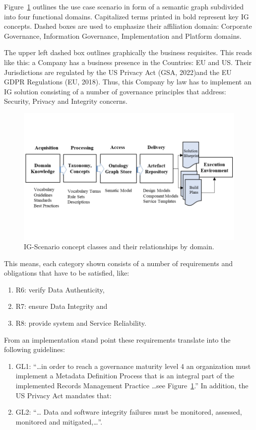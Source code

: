 \documentclass[runningheads]{llncs}
\begin{document}
Figure~\ref{fig3} outlines the use case scenario in form of a semantic graph subdivided into four functional domains. Capitalized terms printed in bold represent key IG concepts. Dashed boxes are used to emphasize their affiliation domain: Corporate Governance, Information Governance, Implementation and Platform domains.

The upper left dashed box outlines graphically the business requisites. This reads like this: a Company has a business presence in the Countries: EU and US. Their Jurisdictions are regulated by the US Privacy Act (GSA, 2022)and the EU GDPR Regulations (EU, 2018). Thus, this Company by law has to implement an IG solution consisting of a number of governance principles that address: Security, Privacy and Integrity concerns.

\begin{figure} [h]
 \centering
\includegraphics[page=3,width=.8\textwidth]{IGSModelsLarge.pdf}
\caption{IG-Scenario concept classes and their relationships by domain.} \label{fig3}
\end{figure} \vspace{-10pt}

This means, each category shown consists of a number of requirements and obligations that have to be satisfied, like: 
\begin{enumerate}
    \item R6: verify Data Authenticity, 
    \item R7: ensure Data Integrity and 
    \item R8: provide system and Service Reliability. 
\end{enumerate}

From an implementation stand point these requirements translate into the following guidelines:
\begin{enumerate}
    \item GL1: “…in order to reach a governance maturity level 4 an organization must implement a Metadata Definition Process that is an integral part of the implemented Records Management Practice …see Figure~\ref{fig3}.”  In addition, the US Privacy Act mandates that:
    \item GL2: “… Data and software integrity failures must be monitored, assessed, monitored and mitigated,…”. 
\end{enumerate}
\end{document}
